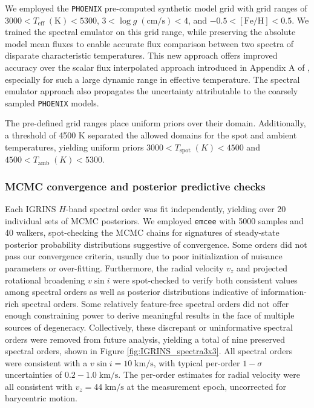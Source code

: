 \documentclass[trackchanges]{aastex631}
\begin{document}
We employed the \texttt{PHOENIX} pre-computed synthetic model grid \citep{husser13} with grid ranges of $3000 < T_{\mathrm{eff}} \; (\textrm{K}) < 5300 $, $3 < \log{g \;(\textrm{cm/s})}  < 4 $, and $ -0.5 <  [\mathrm{Fe}/\mathrm{H}] <0.5$.  We trained the spectral emulator \citep{czekala15} on this grid range, while preserving the absolute model mean fluxes to enable accurate flux comparison between two spectra of disparate characteristic temperatures.  This new approach offers improved accuracy over the scalar flux interpolated approach introduced in Appendix A of \citet{gullysantiago17}, especially for such a large dynamic range in effective temperature.  The spectral emulator approach also propagates the uncertainty attributable to the coarsely sampled \texttt{PHOENIX} models.

The pre-defined grid ranges place uniform priors over their domain.  Additionally, a threshold of 4500 K separated the allowed domains for the spot and ambient temperatures, yielding uniform priors $3000 < T_{\mathrm{spot}} \; (K) < 4500 $ and $4500 < T_{\mathrm{amb}} \; (K) < 5300$.

\subsubsection{MCMC convergence and posterior predictive checks}

Each IGRINS $H$-band spectral order was fit independently, yielding over 20 individual sets of MCMC posteriors.  We employed \texttt{emcee} \citep{foreman13} with 5000 samples and 40 walkers, spot-checking the MCMC chains for signatures of steady-state posterior probability distributions suggestive of convergence.  Some orders did not pass our convergence criteria, usually due to poor initialization of nuisance parameters or over-fitting.  Furthermore, the radial velocity $v_z$ and projected rotational broadening $v\sin{i}$ were spot-checked to verify both consistent values among spectral orders as well as posterior distributions indicative of information-rich spectral orders.  Some relatively feature-free spectral orders did not offer enough constraining power to derive meaningful results in the face of multiple sources of degeneracy.  Collectively, these discrepant or uninformative spectral orders were removed from future analysis, yielding a total of nine preserved spectral orders, shown in Figure \ref{fig:IGRINS_spectra3x3}. All spectral orders were consistent with a $v\sin{i}=10 \;\mathrm{km/s}$, with typical per-order $1-\sigma$ uncertainties of $0.2-1.0 \;\mathrm{km/s}$.  The per-order estimates for radial velocity were all consistent with $v_z=44\;\mathrm{km/s}$ at the measurement epoch, uncorrected for barycentric motion.
\end{document}
